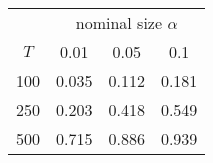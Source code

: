 % 
\begin{tabular}{cccc}
  \hline
  & \multicolumn{3}{c}{nominal size $\alpha$} \\
 $T$ & 0.01 & 0.05 & 0.1 \\
 \hline
100 & 0.035 & 0.112 & 0.181 \\ 
  250 & 0.203 & 0.418 & 0.549 \\ 
  500 & 0.715 & 0.886 & 0.939 \\ 
   \hline
\end{tabular}
